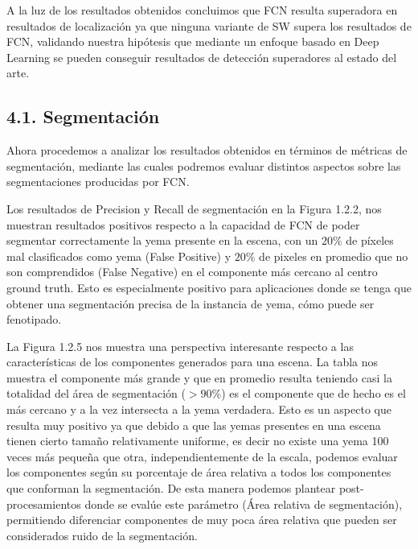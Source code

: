 \documentclass[a4paper,authoryear,review]{elsarticle}
\begin{document}
A la luz de los resultados obtenidos concluimos que FCN resulta superadora en resultados de localización ya que ninguna variante de SW supera los resultados de FCN, validando nuestra hipótesis que mediante un enfoque basado en Deep Learning se pueden conseguir resultados de detección superadores al estado del arte.

\subsection{4.1. Segmentación}
Ahora procedemos a analizar los resultados obtenidos en términos de métricas de segmentación, mediante las cuales podremos evaluar distintos aspectos sobre las segmentaciones producidas por FCN.

Los resultados de Precision y Recall de segmentación en la Figura 1.2.2, nos muestran resultados positivos respecto a la capacidad de FCN de poder segmentar correctamente la yema presente en la escena, con un $20\%$ de píxeles mal clasificados como yema (False Positive) y $20\%$ de pixeles en promedio que no son comprendidos (False Negative) en el componente más cercano al centro ground truth. Esto es especialmente positivo para aplicaciones donde se tenga que obtener una segmentación precisa de la instancia de yema, cómo puede ser fenotipado. 

La Figura 1.2.5 nos muestra una perspectiva interesante respecto a las características de los componentes generados para una escena. La tabla nos muestra el componente más grande y que en promedio resulta teniendo casi la totalidad del área de segmentación ($> 90\%$) es el componente que de hecho es el más cercano y a la vez intersecta a la yema verdadera. Esto es un aspecto que resulta muy positivo ya que debido a que las yemas presentes en una escena tienen cierto tamaño relativamente uniforme, es decir no existe una yema 100 veces más pequeña que otra, independientemente de la escala, podemos evaluar los componentes según su porcentaje de área relativa a todos los componentes que conforman la segmentación. De esta manera podemos plantear post-procesamientos donde se evalúe este parámetro (Área relativa de segmentación), permitiendo diferenciar componentes de muy poca área relativa que pueden ser considerados ruido de la segmentación.
\end{document}
